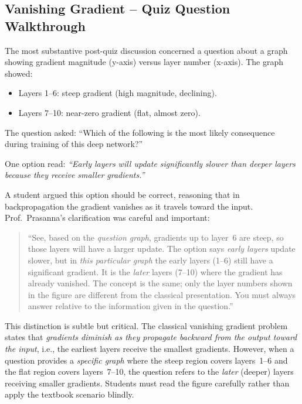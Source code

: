 \documentclass[12pt,a4paper]{article}
\begin{document}
\subsection{Vanishing Gradient -- Quiz Question Walkthrough}
\label{ssec:vanishing_quiz}

The most substantive post-quiz discussion concerned a question about a
graph showing gradient magnitude (y-axis) versus layer number (x-axis).
The graph showed:
\begin{itemize}[leftmargin=1.5cm]
  \item Layers 1--6: steep gradient (high magnitude, declining).
  \item Layers 7--10: near-zero gradient (flat, almost zero).
\end{itemize}

The question asked: ``Which of the following is the most likely
consequence during training of this deep network?''

One option read: \textit{``Early layers will update significantly slower
than deeper layers because they receive smaller gradients.''}

\medskip
\noindent
A student argued this option should be correct, reasoning that in
backpropagation the gradient vanishes as it travels toward the input.
Prof.\ Prasanna's clarification was careful and important:

\begin{quote}
  ``See, based on the \emph{question graph}, gradients up to layer~6 are
  steep, so those layers will have a larger update.  The option says
  \emph{early layers} update slower, but in \emph{this particular graph}
  the early layers (1--6) still have a significant gradient.  It is the
  \emph{later} layers (7--10) where the gradient has already
  vanished.  The concept is the same; only the layer numbers shown in the
  figure are different from the classical presentation.  You must always
  answer relative to the information given in the question.''
\end{quote}

\begin{keyinsight}
This distinction is subtle but critical.  The classical vanishing
gradient problem states that \emph{gradients diminish as they propagate
backward from the output toward the input}, i.e., the earliest layers
receive the smallest gradients.  However, when a question provides a
\emph{specific graph} where the steep region covers layers~1--6 and the
flat region covers layers~7--10, the question refers to the \emph{later}
(deeper) layers receiving smaller gradients.  Students must read the
figure carefully rather than apply the textbook scenario blindly.
\end{keyinsight}
\end{document}
